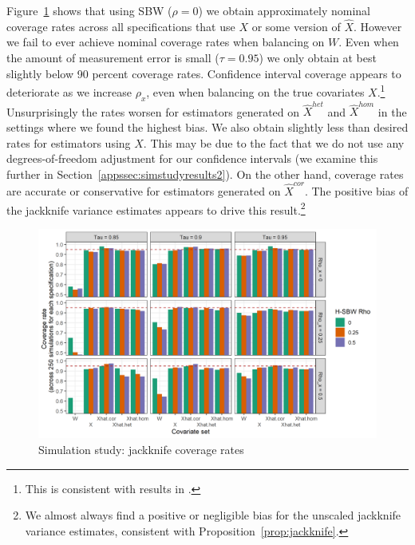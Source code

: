 Figure~\ref{fig:simcoverage1} shows that using SBW ($\rho = 0$) we obtain approximately nominal coverage rates across all specifications that use $X$ or some version of $\hat{X}$. However we fail to ever achieve nominal coverage rates when balancing on $W$. Even when the amount of measurement error is small ($\tau = 0.95$) we only obtain at best slightly below 90 percent coverage rates. Confidence interval coverage appears to deteriorate as we increase $\rho_x$, even when balancing on the true covariates $X$.\footnote{This is consistent with results in \cite{cameron2008bootstrap}.} Unsurprisingly the rates worsen for estimators generated on $\hat{X}^{het}$ and $\hat{X}^{hom}$ in the settings where we found the highest bias. We also obtain slightly less than desired rates for estimators using $X$. This may be due to the fact that we do not use any degrees-of-freedom adjustment for our confidence intervals (we examine this further in Section~\ref{appssec:simstudyresults2}). On the other hand, coverage rates are accurate or conservative for estimators generated on $\hat{X}^{cor}$. The positive bias of the jackknife variance estimates appears to drive this result.\footnote{We almost always find a positive or negligible bias for the unscaled jackknife variance estimates, consistent with Proposition~\ref{prop:jackknife}.}

\begin{figure}[H]
\begin{center}
    \caption{Simulation study: jackknife coverage rates}\label{fig:simcoverage1}
    \includegraphics[scale=0.5]{01_Plots/coverage-plot-1.png}
\end{center}
\end{figure}

